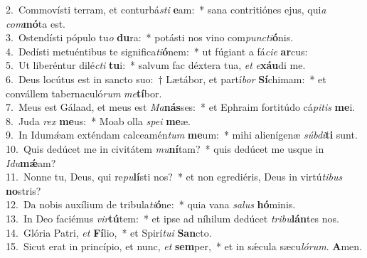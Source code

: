 {2.~}Commovísti terram, et conturbá\textit{sti} \textbf{e}am:~* sana contritiónes ejus, qui\textit{a} \textit{com}\textbf{mó}ta est.\\
{3.~}Ostendísti pópulo tu\textit{o} \textbf{du}ra:~* potásti nos vino com\textit{pun}\textit{cti}\textbf{ó}nis.\\
{4.~}Dedísti metuéntibus te significa\textit{ti}\textbf{ó}nem:~* ut fúgiant a fá\textit{ci}\textit{e} \textbf{ar}cus:\\
{5.~}Ut liberéntur dilé\textit{cti} \textbf{tu}i:~* salvum fac déxtera tua, \textit{et} \textit{e}\textbf{xáu}di me.\\
{6.~}Deus locútus est in sancto suo:~† Lætábor, et partí\textit{bor} \textbf{Sí}chimam:~* et convállem tabernaculó\textit{rum} \textit{me}\textbf{tí}bor.\\
{7.~}Meus est Gálaad, et meus est \textit{Ma}\textbf{nás}ses:~* et Ephraim fortitúdo cá\textit{pi}\textit{tis} \textbf{me}i.\\
{8.~}Juda \textit{rex} \textbf{me}us:~* Moab olla \textit{spe}\textit{i} \textbf{me}æ.\\
{9.~}In Idumǽam exténdam calceamén\textit{tum} \textbf{me}um:~* mihi alienígenæ \textit{súb}\textit{di}\textbf{ti} sunt.\\
{10.~}Quis dedúcet me in civitátem \textit{mu}\textbf{ní}tam?~* quis dedúcet me usque in \textit{I}\textit{du}\textbf{mǽ}am?\\
{11.~}Nonne tu, Deus, qui re\textit{pu}\textbf{lí}sti nos?~* et non egrediéris, Deus in virtú\textit{ti}\textit{bus} \textbf{no}stris?\\
{12.~}Da nobis auxílium de tribula\textit{ti}\textbf{ó}ne:~* quia vana \textit{sa}\textit{lus} \textbf{hó}minis.\\
{13.~}In Deo faciémus \textit{vir}\textbf{tú}tem:~* et ipse ad níhilum dedúcet \textit{tri}\textit{bu}\textbf{lán}tes nos.\\
{14.~}Glória Patri, \textit{et} \textbf{Fí}lio,~* et Spirí\textit{tu}\textit{i} \textbf{San}cto.\\
{15.~}Sicut erat in princípio, et nunc, \textit{et} \textbf{sem}per,~* et in sǽcula sæcu\textit{ló}\textit{rum}. \textbf{A}men.\\
